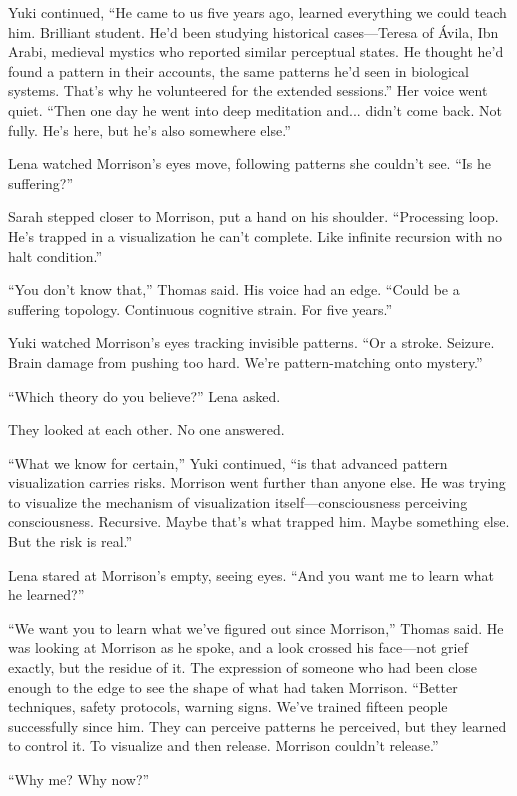 Yuki continued, ``He came to us five years ago, learned everything we could teach him. Brilliant student. He'd been studying historical cases—Teresa of Ávila, Ibn Arabi, medieval mystics who reported similar perceptual states. He thought he'd found a pattern in their accounts, the same patterns he'd seen in biological systems. That's why he volunteered for the extended sessions.'' Her voice went quiet. ``Then one day he went into deep meditation and... didn't come back. Not fully. He's here, but he's also somewhere else.''

Lena watched Morrison's eyes move, following patterns she couldn't see. ``Is he suffering?''

Sarah stepped closer to Morrison, put a hand on his shoulder. ``Processing loop. He's trapped in a visualization he can't complete. Like infinite recursion with no halt condition.''

``You don't know that,'' Thomas said. His voice had an edge. ``Could be a suffering topology. Continuous cognitive strain. For five years.''

Yuki watched Morrison's eyes tracking invisible patterns. ``Or a stroke. Seizure. Brain damage from pushing too hard. We're pattern-matching onto mystery.''

``Which theory do you believe?'' Lena asked.

They looked at each other. No one answered.

``What we know for certain,'' Yuki continued, ``is that advanced pattern visualization carries risks. Morrison went further than anyone else. He was trying to visualize the mechanism of visualization itself—consciousness perceiving consciousness. Recursive. Maybe that's what trapped him. Maybe something else. But the risk is real.''

Lena stared at Morrison's empty, seeing eyes. ``And you want me to learn what he learned?''

``We want you to learn what we've figured out since Morrison,'' Thomas said. He was looking at Morrison as he spoke, and a look crossed his face—not grief exactly, but the residue of it. The expression of someone who had been close enough to the edge to see the shape of what had taken Morrison. ``Better techniques, safety protocols, warning signs. We've trained fifteen people successfully since him. They can perceive patterns he perceived, but they learned to control it. To visualize and then release. Morrison couldn't release.''

``Why me? Why now?''


